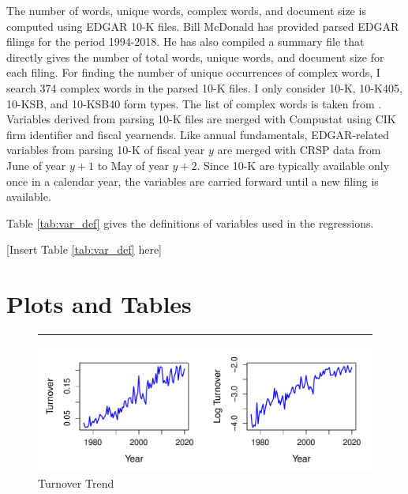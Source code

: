 \documentclass[
  12pt,
  a4paper,
  twoside,
  onecolumn]{article}
\begin{document}
The number of words, unique words, complex words, and document size is
computed using EDGAR 10-K files. Bill McDonald has provided parsed EDGAR
filings for the period 1994-2018. He has also compiled a summary file
that directly gives the number of total words, unique words, and
document size for each filing. For finding the number of unique
occurrences of complex words, I search 374 complex words in the parsed
10-K files. I only consider 10-K, 10-K405, 10-KSB, and 10-KSB40 form
types. The list of complex words is taken from
\cite{lm_2020_firm_complexity}. Variables derived from parsing 10-K
files are merged with Compustat using CIK firm identifier and fiscal
yearnends. Like annual fundamentals, EDGAR-related variables from
parsing 10-K of fiscal year \(y\) are merged with CRSP data from June of
year \(y+1\) to May of year \(y+2\). Since 10-K are typically available
only once in a calendar year, the variables are carried forward until a
new filing is available.

Table \ref{tab:var_def} gives the definitions of variables used in the
regressions.

\begin{center} { [Insert Table \ref{tab:var_def} here] } \end{center}

\newpage
\clearpage

\renewcommand{\thesection}{\arabic{section}}
\renewcommand{\thesubsection}{\thesection.\arabic{subsection}}
\renewcommand{\thesubsubsection}{\thesection.\arabic{subsection}.\arabic{subsubsection}}

\hypertarget{plots-and-tables}{%
\section*{Plots and Tables}\label{plots-and-tables}}

\renewcommand{\thetable}{\arabic{table}}
\setcounter{table}{0}
\renewcommand\thefigure{\arabic{figure}}
\setcounter{figure}{0}

\begin{figure}
\caption{Turnover Trend}
\label{fig:turn_mean_trend}
\rule[0.25ex]{\linewidth}{1pt}
\begin{center}
\includegraphics{turn_mean_trend.pdf}
\end{center}
\end{figure}
\end{document}
